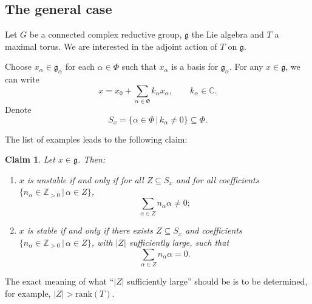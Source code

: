 \documentclass[12pt]{amsart}
\newcommand{\C}{\mathbb{C}}
\newcommand{\Z}{\mathbb{Z}}
\newcommand{\g}{\mathfrak{g}}
\newtheorem{claim}[theorem]{Claim}
\theoremstyle{remark}
\theoremstyle{remark}
\theoremstyle{remark}
\begin{document}

\subsection{The general case}
Let $G$ be a connected complex reductive group, $\g$ the Lie algebra and $T$ a maximal torus.
We are interested in the adjoint action of $T$ on $\g$.

Choose $x_\alpha \in \g_\alpha$ for each $\alpha \in \Phi$ such that $x_\alpha$ is a basis for $\g_\alpha$.
For any $x \in \g$, we can write
$$x = x_0 + \sum_{\alpha \in \Phi} k_\alpha x_\alpha, \qquad k_\alpha \in \C.$$
Denote
$$S_x = \{\alpha \in \Phi \, | \, k_\alpha \ne 0\} \subseteq \Phi.$$

The list of examples leads to the following claim:

\begin{claim}
Let $x \in \g$.
Then:
\begin{enumerate}[label=(\roman*)]
\item
$x$ is unstable if and only if for all $Z \subseteq S_x$ and for all coefficients $\{n_\alpha \in \Z_{>0} \, | \, \alpha \in Z\}$, 
$$\sum_{\alpha \in Z} n_\alpha \alpha \ne 0;$$

\item
$x$ is stable if and only if there exists $Z \subseteq S_x$ and coefficients $\{n_\alpha \in \Z_{>0} \, | \, \alpha \in Z\}$, with $|Z|$ sufficiently large, such that
$$\sum_{\alpha \in Z} n_\alpha \alpha = 0.$$
\end{enumerate}
\end{claim}

The exact meaning of what ``$|Z|$ sufficiently large'' should be is to be determined, for example, $|Z| > \mathrm{rank}(T)$.
\end{document}
